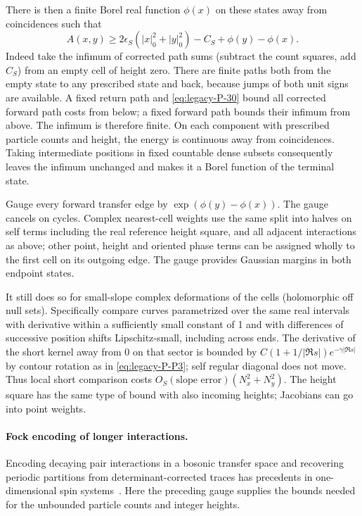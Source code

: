 There is then a finite Borel real function \(\phi(x)\) on these states away from coincidences such that
\[
 A(x,y)\ge 2\epsilon_S(|x|_0^2+|y|_0^2)-C_S+\phi(y)-\phi(x).
\]
Indeed take the infimum of corrected path sums (subtract the count squares, add \(C_S\)) from an empty cell of height zero. There are finite paths both from the empty state to any prescribed
state and back, because jumps of both unit signs are available.  A fixed
return path and \eqref{eq:legacy-P-30} bound all corrected forward path costs from below;
a fixed forward path bounds their infimum from above.  The infimum is
therefore finite.  On each component with prescribed particle counts
and height, the energy is continuous away from coincidences.  Taking
intermediate positions in fixed countable dense subsets consequently
leaves the infimum unchanged and makes it a Borel function of the terminal state.

Gauge every forward transfer edge by \(\exp(\phi(y)-\phi(x))\). The gauge cancels on cycles. Complex nearest-cell weights use the same split into halves on self terms including the real reference height square, and all adjacent interactions as above; other point, height and oriented phase terms can be assigned wholly to the first cell on its outgoing edge. The gauge provides Gaussian margins in both endpoint states.

It still does so for small-slope complex deformations of the cells (holomorphic off null sets). Specifically compare curves parametrized over the same real intervals with derivative within a sufficiently small constant of 1 and with differences of successive position shifts Lipschitz-small, including across ends. The derivative of the short kernel away from 0 on that sector is bounded by \(C(1+1/|\Re s|)e^{-\gamma|\Re s|}\) by contour rotation as in \eqref{eq:legacy-P-P3}; self regular diagonal does not move. Thus local short comparison costs \(O_S(\text{slope error})(N_x^2+N_y^2)\). The height square has the same type of bound with also incoming heights; Jacobians can go into point weights.



\paragraph{Fock encoding of longer interactions.}
Encoding decaying pair interactions in a bosonic transfer space and recovering
periodic partitions from determinant-corrected traces has precedents in
one-dimensional spin systems~\cite[Sections~4--6]{HilgertRilke2008}.
Here the preceding gauge supplies the bounds needed for the unbounded
particle counts and integer heights.

